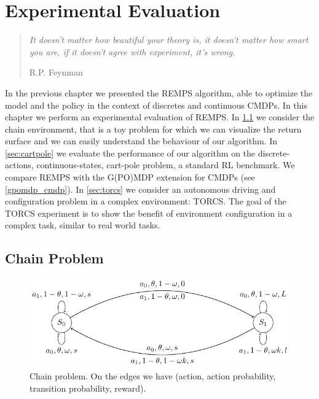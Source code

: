 \chapter{Experimental Evaluation}
\label{experimental_evaluation}
\thispagestyle{empty}

\begin{quotation}
{\footnotesize
\noindent \emph{It doesn't matter how beautiful your theory is, it doesn't matter how smart you are, if it doesn't agree with experiment, it's wrong.}
\begin{flushright}
R.P. Feynman
\end{flushright}
}
\end{quotation}
\vspace{0.5cm}

\noindent In the previous chapter we presented the REMPS algorithm, able to optimize the model and the policy in the context of discretes and continuous CMDPs. In this chapter we perform an experimental evaluation of REMPS. In \cref{sec:chain} we consider the chain environment, that is a toy problem for which we can visualize the return surface and we can easily understand the behaviour of our algorithm.
In \cref{sec:cartpole} we evaluate the performance of our algorithm on the discrete-actions, continuous-states, cart-pole problem, a standard RL benchmark. We compare REMPS with the G(PO)MDP \citep{gpomdp} extension for CMDPs (see \cref{gpomdp_cmdp}).
In \cref{sec:torcs} we consider an autonomous driving and configuration problem in a complex environment: TORCS. The goal of the TORCS experiment is to show the benefit of environment configuration in a complex task, similar to real world tasks.
\section{Chain Problem} \label{sec:chain}

\begin{figure}
\centering
	\includegraphics[width=\textwidth]{pictures/chain}
	\caption{Chain problem. On the edges we have (action, action probability, transition probability, reward).}
	\label{fig:chain}
\end{figure}

